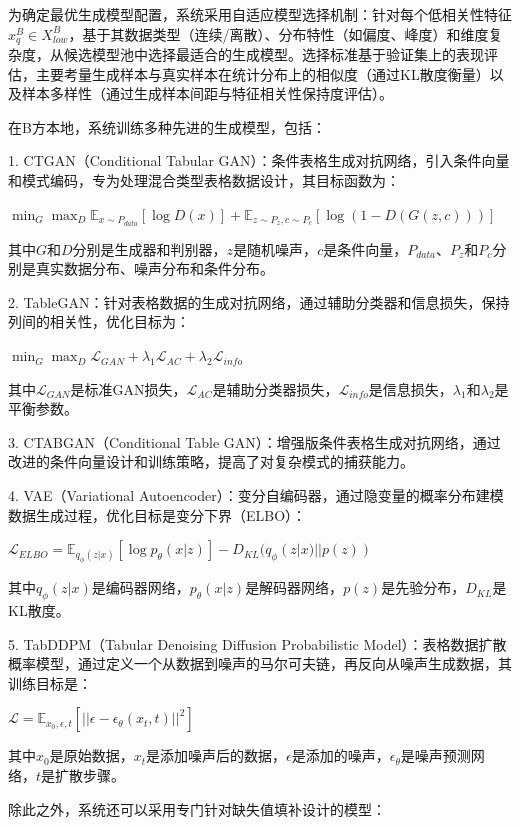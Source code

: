 为确定最优生成模型配置，系统采用自适应模型选择机制：针对每个低相关性特征$x^B_q \in X^B_{low}$，基于其数据类型（连续/离散）、分布特性（如偏度、峰度）和维度复杂度，从候选模型池中选择最适合的生成模型。选择标准基于验证集上的表现评估，主要考量生成样本与真实样本在统计分布上的相似度（通过KL散度衡量）以及样本多样性（通过生成样本间距与特征相关性保持度评估）。


在B方本地，系统训练多种先进的生成模型，包括：

1. CTGAN（Conditional Tabular GAN）：条件表格生成对抗网络，引入条件向量和模式编码，专为处理混合类型表格数据设计，其目标函数为：

$\min_G \max_D \mathbb{E}_{x \sim P_{data}}[\log D(x)] + \mathbb{E}_{z \sim P_z, c \sim P_c}[\log(1 - D(G(z, c)))]$

其中$G$和$D$分别是生成器和判别器，$z$是随机噪声，$c$是条件向量，$P_{data}$、$P_z$和$P_c$分别是真实数据分布、噪声分布和条件分布。

2. TableGAN：针对表格数据的生成对抗网络，通过辅助分类器和信息损失，保持列间的相关性，优化目标为：

$\min_G \max_D \mathcal{L}_{GAN} + \lambda_1 \mathcal{L}_{AC} + \lambda_2 \mathcal{L}_{info}$

其中$\mathcal{L}_{GAN}$是标准GAN损失，$\mathcal{L}_{AC}$是辅助分类器损失，$\mathcal{L}_{info}$是信息损失，$\lambda_1$和$\lambda_2$是平衡参数。

3. CTABGAN（Conditional Table GAN）：增强版条件表格生成对抗网络，通过改进的条件向量设计和训练策略，提高了对复杂模式的捕获能力。

4. VAE（Variational Autoencoder）：变分自编码器，通过隐变量的概率分布建模数据生成过程，优化目标是变分下界（ELBO）：

$\mathcal{L}_{ELBO} = \mathbb{E}_{q_\phi(z|x)}[\log p_\theta(x|z)] - D_{KL}(q_\phi(z|x) || p(z))$

其中$q_\phi(z|x)$是编码器网络，$p_\theta(x|z)$是解码器网络，$p(z)$是先验分布，$D_{KL}$是KL散度。

5. TabDDPM（Tabular Denoising Diffusion Probabilistic Model）：表格数据扩散概率模型，通过定义一个从数据到噪声的马尔可夫链，再反向从噪声生成数据，其训练目标是：

$\mathcal{L} = \mathbb{E}_{x_0, \epsilon, t}[||\epsilon - \epsilon_\theta(x_t, t)||^2]$

其中$x_0$是原始数据，$x_t$是添加噪声后的数据，$\epsilon$是添加的噪声，$\epsilon_\theta$是噪声预测网络，$t$是扩散步骤。

除此之外，系统还可以采用专门针对缺失值填补设计的模型：

